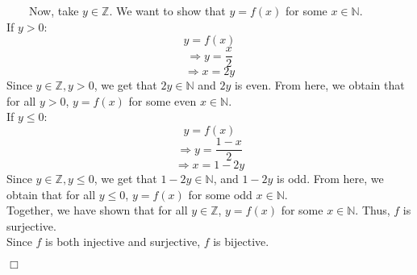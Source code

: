 \documentclass[
]{article}
\begin{document}
~~~~Now, take \(y \in \mathbb{Z}\). We want to show that \(y = f(x)\)
for some \(x \in \mathbb{N}\).\\
If \(y > 0\):\\
\[y = f(x)\] \[\Longrightarrow y = \frac{x}{2}\]
\[\Longrightarrow x = 2y\] Since \(y \in \mathbb{Z}, y > 0\), we get
that \(2y \in \mathbb{N}\) and \(2y\) is even. From here, we obtain that
for all \(y>0\), \(y = f(x)\) for some even \(x \in \mathbb{N}\).\\
If \(y \leq 0\):\\
\[y = f(x)\] \[\Longrightarrow y = \frac{1 - x}{2}\]
\[\Longrightarrow x = 1 - 2y\] Since \(y \in \mathbb{Z}, y \leq 0\), we
get that \(1 - 2y \in \mathbb{N}\), and \(1-2y\) is odd. From here, we
obtain that for all \(y\leq0\), \(y = f(x)\) for some odd
\(x \in \mathbb{N}\).\\
\hspace*{0.333em}\hspace*{0.333em}\hspace*{0.333em}\hspace*{0.333em}Together,
we have shown that for all \(y \in \mathbb{Z}\), \(y = f(x)\) for some
\(x \in \mathbb{N}\). Thus, \(f\) is surjective.\\
\hspace*{0.333em}\hspace*{0.333em}\hspace*{0.333em}\hspace*{0.333em}Since
\(f\) is both injective and surjective, \(f\) is bijective.

\hfill \(\Box\)
\end{document}

